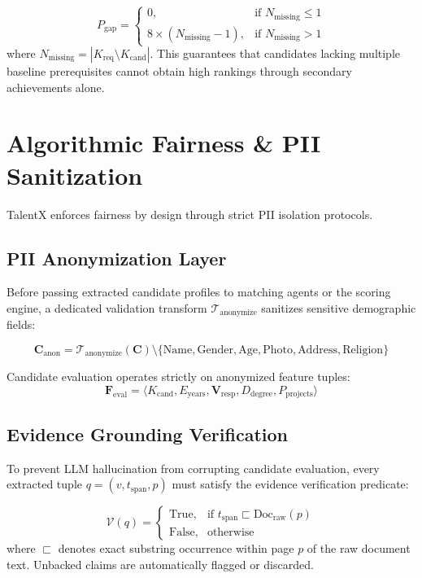 \documentclass[conference]{IEEEtran}
\begin{document}
\begin{equation}
P_{\text{gap}} = \begin{cases} 
0, & \text{if } N_{\text{missing}} \le 1 \\
8 \times (N_{\text{missing}} - 1), & \text{if } N_{\text{missing}} > 1 
\end{cases}
\end{equation}
where $N_{\text{missing}} = |K_{\text{req}} \setminus K_{\text{cand}}|$. This guarantees that candidates lacking multiple baseline prerequisites cannot obtain high rankings through secondary achievements alone.

\section{Algorithmic Fairness \& PII Sanitization}
\label{sec:fairness}
TalentX enforces fairness by design through strict PII isolation protocols.

\subsection{PII Anonymization Layer}
Before passing extracted candidate profiles to matching agents or the scoring engine, a dedicated validation transform $\mathcal{T}_{\text{anonymize}}$ sanitizes sensitive demographic fields:

\begin{equation}
\mathbf{C}_{\text{anon}} = \mathcal{T}_{\text{anonymize}}(\mathbf{C}) \setminus \{\text{Name}, \text{Gender}, \text{Age}, \text{Photo}, \text{Address}, \text{Religion}\}
\end{equation}

Candidate evaluation operates strictly on anonymized feature tuples:
$$\mathbf{F}_{\text{eval}} = \langle K_{\text{cand}}, E_{\text{years}}, \mathbf{V}_{\text{resp}}, D_{\text{degree}}, P_{\text{projects}} \rangle$$

\subsection{Evidence Grounding Verification}
To prevent LLM hallucination from corrupting candidate evaluation, every extracted tuple $q = (v, t_{\text{span}}, p)$ must satisfy the evidence verification predicate:

\begin{equation}
\mathcal{V}(q) = \begin{cases} 
\text{True}, & \text{if } t_{\text{span}} \sqsubset \text{Doc}_{\text{raw}}(p) \\
\text{False}, & \text{otherwise}
\end{cases}
\end{equation}
where $\sqsubset$ denotes exact substring occurrence within page $p$ of the raw document text. Unbacked claims are automatically flagged or discarded.
\end{document}
